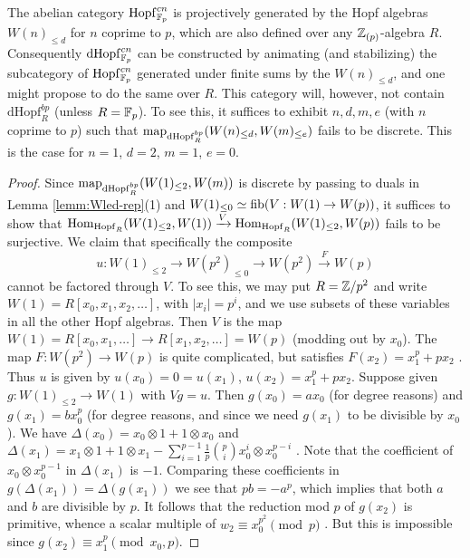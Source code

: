 \documentclass{amsart}
\numberwithin{proposition}{section}
\numberwithin{equation}{section}
\def\Hopf{\mathrm{Hopf}}
\def\dHopf{\mathrm{dHopf}}
\def\Hopf{\mathrm{Hopf}}
\begin{document}
\begin{remark}
The abelian category $\Hopf_{\F_p}^{cn}$ is projectively generated by the Hopf algebras $W(n)_{\le d}$ for $n$ coprime to $p$, which are also defined over any $\mathbb{Z}_{(p)}$-algebra $R$.
Consequently $\dHopf_{\F_p}^{cn}$ can be constructed by animating (and stabilizing) the subcategory of $\Hopf_{\F_p}^{cn}$ generated under finite sums by the $W(n)_{\le d}$, and one might propose to do the same over $R$.
This category will, however, not contain $\dHopf_R^{bp}$ (unless $R=\mathbb{F}_p$).
To see this, it suffices to exhibit $n, d, m, e$ (with $n$ coprime to $p$) such that $\map_{\dHopf_R^{bp}}(W(n)_{\le d}, W(m)_{\le e})$ fails to be discrete.
This is the case for $n=1$, $d=2$, $m=1$, $e=0$.
\end{remark}
\begin{proof}
Since $\map_{\dHopf_R^{bp}}(W(1)_{\le 2}, W(m))$ is discrete by passing to duals in Lemma \ref{lemm:Wled-rep}(1) and $W(1)_{\le 0} \simeq \mathrm{fib}(V: W(1) \to W(p))$, it suffices to show that $\Hom_{\Hopf_R}(W(1)_{\le 2}, W(1)) \xrightarrow{V} \Hom_{\Hopf_R}(W(1)_{\le 2}, W(p))$ fails to be surjective.
We claim that specifically the composite \[ u: W(1)_{\le 2} \to W(p^2)_{\le 0} \to W(p^2) \xrightarrow{F} W(p) \] cannot be factored through $V$.
To see this, we may put $R=\mathbb{Z}/p^2$ and write $W(1) = R[x_0, x_1, x_2, \dots]$, with $|x_i| = p^i$, and we use subsets of these variables in all the other Hopf algebras.
Then $V$ is the map $W(1) = R[x_0, x_1, \dots] \to R[x_1, x_2, \dots] = W(p)$ (modding out by $x_0$).
The map $F: W(p^2) \to W(p)$ is quite complicated, but satisfies $F(x_2) = x_1^p + px_2$ \cite[Proposition 1.8]{goerss-dieudonne}.
Thus $u$ is given by $u(x_0) = 0 = u(x_1)$, $u(x_2) = x_1^p + px_2$.
Suppose given $g: W(1)_{\le 2} \to W(1)$ with $Vg = u$.
Then $g(x_0) = ax_0$ (for degree reasons) and $g(x_1) = bx_0^p$ (for degree reasons, and since we need $g(x_1)$ to be divisible by $x_0$).
We have $\Delta(x_0) = x_0 \otimes 1 + 1 \otimes x_0$ and $\Delta(x_1) = x_1 \otimes 1 + 1 \otimes x_1 - \sum_{i=1}^{p-1}\frac{1}{p} {p \choose i} x_0^i \otimes x_0^{p-i}$ \cite[\S5.9, equation~(5.10)]{hazewinkel-witt-vectors}.
Note that the coefficient of $x_0 \otimes x_0^{p-1}$ in $\Delta(x_1)$ is $-1$.
Comparing these coefficients in $g(\Delta(x_1)) = \Delta(g(x_1))$ we see that $pb=-a^p$, which implies that both $a$ and $b$ are divisible by $p$.
It follows that the reduction mod $p$ of $g(x_2)$ is primitive, whence a scalar multiple of $w_2 \equiv x_0^{p^2} \pmod{p}$ \cite[Remark~(8.4)]{husemoller-hopf}.
But this is impossible since $g(x_2) \equiv x_1^p \pmod{x_0, p}$.
\end{proof}
\end{document}
